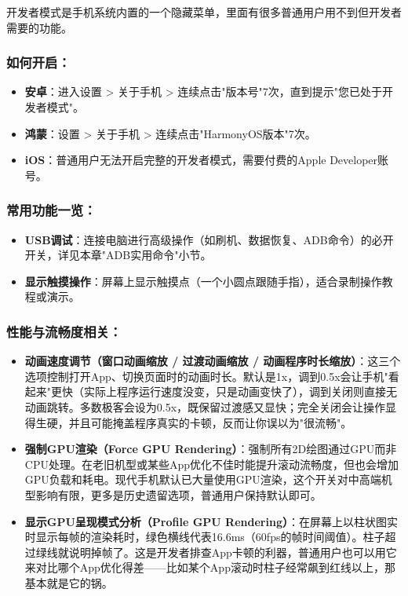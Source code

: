 


开发者模式是手机系统内置的一个隐藏菜单，里面有很多普通用户用不到但开发者需要的功能。

\subsubsection*{如何开启：}

\begin{itemize}
  \item \textbf{安卓}：进入设置 > 关于手机 > 连续点击"版本号"7次，直到提示"您已处于开发者模式"。
  \item \textbf{鸿蒙}：设置 > 关于手机 > 连续点击"HarmonyOS版本"7次。
  \item \textbf{iOS}：普通用户无法开启完整的开发者模式，需要付费的Apple Developer账号。
\end{itemize}

\subsubsection*{常用功能一览：}

\begin{itemize}
  \item \textbf{USB调试}：连接电脑进行高级操作（如刷机、数据恢复、ADB命令）的必开开关，详见本章"ADB实用命令"小节。
  \item \textbf{显示触摸操作}：屏幕上显示触摸点（一个小圆点跟随手指），适合录制操作教程或演示。
\end{itemize}

\subsubsection*{性能与流畅度相关：}

\begin{itemize}
  \item \textbf{动画速度调节（窗口动画缩放 / 过渡动画缩放 / 动画程序时长缩放）}：这三个选项控制打开App、切换页面时的动画时长。默认是1x，调到0.5x会让手机"看起来"更快（实际上程序运行速度没变，只是动画变快了），调到关闭则直接无动画跳转。多数极客会设为0.5x，既保留过渡感又显快；完全关闭会让操作显得生硬，并且可能掩盖程序真实的卡顿，反而让你误以为"很流畅"。
  \item \textbf{强制GPU渲染（Force GPU Rendering）}：强制所有2D绘图通过GPU而非CPU处理。在老旧机型或某些App优化不佳时能提升滚动流畅度，但也会增加GPU负载和耗电。现代手机默认已大量使用GPU渲染，这个开关对中高端机型影响有限，更多是历史遗留选项，普通用户保持默认即可。
  \item \textbf{显示GPU呈现模式分析（Profile GPU Rendering）}：在屏幕上以柱状图实时显示每帧的渲染耗时，绿色横线代表16.6ms（60fps的帧时间阈值）。柱子超过绿线就说明掉帧了。这是开发者排查App卡顿的利器，普通用户也可以用它来对比哪个App优化得差——比如某个App滚动时柱子经常飙到红线以上，那基本就是它的锅。
\end{itemize}

